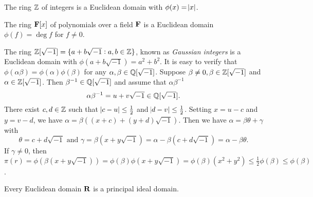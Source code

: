 \begin{example}
The ring $\mathbb{Z}$ of integers is a Euclidean domain with $\phi(x) = \abs{x}$. 
\end{example}

\begin{example}
The ring $\mathbf{F}[x]$ of polynomials over a field $\mathbf{F}$ is a Euclidean domain 
$\phi(f) = \deg f$ for $f \neq 0$. 
\end{example}

\begin{example}
The ring $\mathbb{Z}[\sqrt{-1}] = \{a + b\sqrt{-1}: a, b \in \mathbb{Z}\}$, known as 
\emph{Gaussian integers} is a Euclidean domain with $\phi(a + b\sqrt{-1}) 
= a^2 + b^2$.
It is easy to verify that $\phi(\alpha \beta) = \phi(\alpha) \phi(\beta)$ 
for any $\alpha, \beta \in \mathbb{Q}[\sqrt{-1}]$. 
Suppose $\beta \neq 0, \beta \in \mathbb{Z}[\sqrt{-1}]$ and $\alpha \in 
\mathbb{Z}[\sqrt{-1}]$. 
Then $\beta^{-1} \in \mathbb{Q}[\sqrt{-1}]$ and assume that $\alpha \beta^{-1}$ 
\begin{equation*}
    \alpha \beta^{-1} = u + v \sqrt{-1} \in \mathbb{Q}[\sqrt{-1}].
\end{equation*}
There exist $c, d \in \mathbb{Z}$ such that $\abs{c - u} \le \frac{1}{2}$ and 
$\abs{d - v} \le \frac{1}{2}$. 
Setting $x = u - c$ and $y = v - d$, we have $\alpha = \beta \left( 
(x + c) + (y + d) \sqrt{-1}\right)$. 
Then we have $\alpha = \beta \theta + \gamma$ with 
\begin{equation}
    \theta = c + d\sqrt{-1} \text{ and } \gamma = \beta(x + y \sqrt{-1}) = 
    \alpha - \beta (c + d \sqrt{-1}) = \alpha - \beta \theta.
\end{equation}
If $\gamma \neq 0$, then $\pi(r) = \phi(\beta (x + y\sqrt{-1})) 
= \phi(\beta) \phi(x + y \sqrt{-1}) = \phi(\beta) \left( x^2 + y^2 \right) 
\le \frac{1}{2} \phi(\beta) \le \phi(\beta)$. 
\end{example}

\begin{thm}
Every Euclidean domain $\mathbf{R}$ is a principal ideal domain. 
\end{thm}